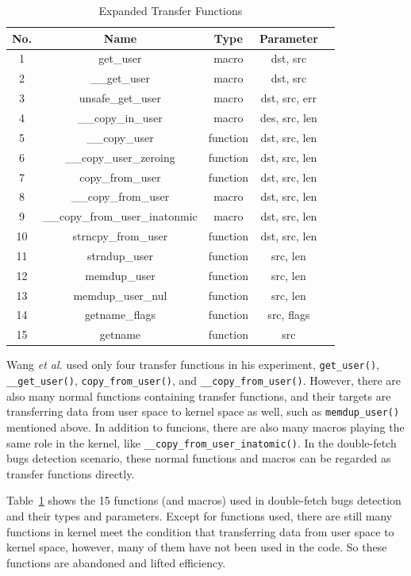 \documentclass[10pt]{llncs}
\begin{document}
\begin{table}[t!]
\caption{Expanded Transfer Functions}
\centering
\begin{tabular}{ccccc} 
  \hline
  \textbf{No.} & \textbf{Name} & \textbf{Type} & \textbf{Parameter} \\
  \hline
  1 & get\_user & macro & dst, src \\
  2 & \_\_get\_user & macro & dst, src \\
  3 & unsafe\_get\_user & macro & dst, src, err \\
  4 & \_\_copy\_in\_user & macro & des, src, len \\
  5 & \_\_copy\_user & function & dst, src, len \\
  6 & \_\_copy\_user\_zeroing & function & dst, src, len \\
  7 & copy\_from\_user & function & dst, src, len \\
  8 & \_\_copy\_from\_user & macro & dst, src, len \\
  9 & \_\_copy\_from\_user\_inatonmic & macro & dst, src, len \\
  10 & strncpy\_from\_user & function & dst, src, len \\
  11 & strndup\_user & function & src, len \\
  12 & memdup\_user & function & src, len \\
  13 & memdup\_user\_nul & function & src, len \\
  14 & getname\_flags & function & src, flags \\
  15 & getname & function & src \\
  \hline
\end{tabular}
\label{transfer-func}
\end{table}

Wang \textit{et al.} used only four transfer functions in his experiment, \verb:get_user():, \verb:__get_user():, \verb:copy_from_user():, and \verb:__copy_from_user():. However, there are also many normal functions containing transfer functions, and their targets are transferring data from user space to kernel space as well, such as \verb:memdup_user(): mentioned above. In addition to funcions, there are also many macros playing the same role in the kernel, like \verb:__copy_from_user_inatomic():.
In the double-fetch bugs detection scenario, these normal functions and macros can be regarded as transfer functions directly. 

Table~\ref{transfer-func} shows the 15 functions (and macros) used in double-fetch bugs detection and their types and parameters. Except for functions used, there are still many functions in kernel meet the condition that transferring data from user space to kernel space, however, many of them have not been used in the code. So these functions are abandoned and lifted efficiency.
\end{document}
